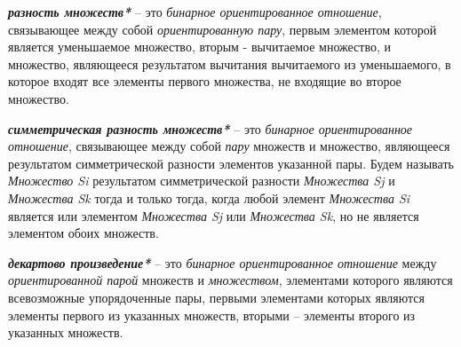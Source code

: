 \textbf{\textit{разность множеств*}} – это \textit{бинарное ориентированное отношение}, связывающее между собой \textit{ориентированную пару}, первым элементом которой является уменьшаемое множество, вторым - вычитаемое множество, и множество, являющееся результатом вычитания вычитаемого из уменьшаемого, в которое входят все элементы первого множества, не входящие во второе множество.




\textbf{\textit{симметрическая разность множеств*}} – это \textit{бинарное ориентированное отношение}, связывающее между собой \textit{пару} множеств и множество, являющееся результатом симметрической разности элементов указанной пары. Будем называть \textit{Множество Si} результатом симметрической разности \textit{Множества Sj} и \textit{Множества Sk} тогда и только тогда, когда любой элемент \textit{Множества Si} является или элементом \textit{Множества Sj} или \textit{Множества Sk}, но не является элементом обоих множеств.




\textbf{\textit{декартово произведение*}} – это \textit{бинарное ориентированное отношение} между \textit{ориентированной парой} множеств и \textit{множеством}, элементами которого являются всевозможные упорядоченные пары, первыми элементами которых являются элементы первого из указанных множеств, вторыми – элементы второго из указанных множеств.


